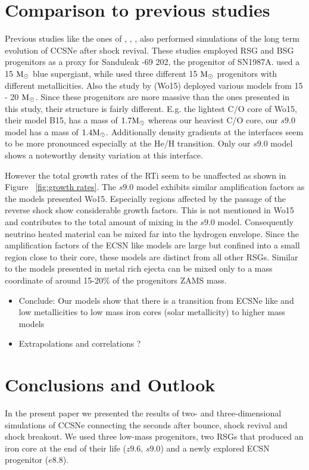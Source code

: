 \documentclass[fleqn,usenatbib]{mnras}
\newcommand{\solm}{\xspace\ensuremath{\rm{M_{\odot}}}\xspace}
\newcommand{\COM}[1]{{\color{orange}#1}}
\begin{document}
\section{Comparison to previous studies}
\label{sec:Comparison to previous studies}

Previous studies like the ones of \cite{Hammer2010}, \cite{Joggerst2010}, \citet{Wongwathanarat2015}, \citet{Kifonidis2006} also performed simulations of the long term evolution of CCSNe after shock revival. These studies employed RSG and BSG progenitors as a proxy for Sanduleak -69 202, the progenitor of SN1987A. \citet{Hammer2010} used a 15 \solm blue supergiant, while \citet{Joggerst2010} used three different 15 \solm progenitors with different metallicities. Also the study by
\citet{Wongwathanarat2015} (Wo15) deployed various models from 15 - 20 \solm. 
Since these progenitors are more massive than the ones presented in this study, their structure is fairly different. E.g. the lightest C/O core of Wo15, their model B15, has a mass of $1.7\solm$ whereas our heaviest C/O core, our $s9.0$ model has a mass of $1.4\solm$. Additionally density gradients at the interfaces seem to be more pronounced especially at the He/H transition. Only our $s9.0$ model shows a noteworthy density variation at this interface.

However the total growth rates of the RTi seem to be unaffected as shown in Figure ~\ref{fig:growth rates}. The $s9.0$ model exhibits similar amplification factors as the models presented Wo15. Especially regions affected by the passage of the reverse shock show considerable growth factors. This is not mentioned in Wo15 and contributes to the total amount of mixing in the $s9.0$ model. Consequently neutrino heated material can be mixed far into the hydrogen envelope. 
Since the amplification factors of the ECSN like models are large but confined into a small region close to their core, these models are distinct from all other RSGs. Similar to the models presented in \citet{Joggerst2010} metal rich ejecta can be mixed only to a mass coordinate of around 15-20\% of the progenitors ZAMS mass.
\COM{
\begin{itemize}
    \item Conclude: Our models show that there is a transition from ECSNe like and low metallicities to low mass iron cores (solar metallicity) to higher mass models
    \item Extrapolations and correlations ?
\end{itemize}
}

\section{Conclusions and Outlook}
In the present paper we presented the results of two- and three-dimensional simulations of CCSNe connecting the seconds after bounce, shock revival and shock breakout. We used three low-mass progenitors, two RSGs that produced an iron core at the end of their life ($z9.6$, $s9.0$) and a newly explored ECSN progenitor ($e8.8$). 
\end{document}
